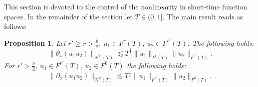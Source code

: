 \documentclass{amsart}
\newtheorem{proposition}[theorem]{Proposition}
\theoremstyle{definition}
\begin{document}
This section is devoted to the control of the nonlinearity in short-time function spaces. In the remainder of the section let $T \in (0,1]$. The main result reads as follows:
\begin{proposition}
\label{prop:NonlinearEstimate}
Let $r' \geq r > \frac{b}{2}$, $u_1 \in F^r(T)$, $u_2 \in F^{r'}(T)$. The following holds:
\begin{equation*}
\| \partial_x (u_1 u_2) \|_{\mathcal{N}^{r'}(T)} \lesssim T^{\frac{1}{4}} \| u_1 \|_{F^{r}(T)} \| u_2 \|_{F^{r'}(T)}.
\end{equation*}
For $r' > \frac{b}{2}$, $u_1 \in F^{r'}(T)$, $u_2 \in F^0(T)$ the following holds:
\begin{equation*}
\| \partial_x (u_1 u_2) \|_{\mathcal{N}^{0}(T)} \lesssim T^{\frac{1}{4}} \| u_1 \|_{F^{r'}(T)} \| u_2 \|_{F^{0}(T)}.
\end{equation*}
\end{proposition}
\end{document}

